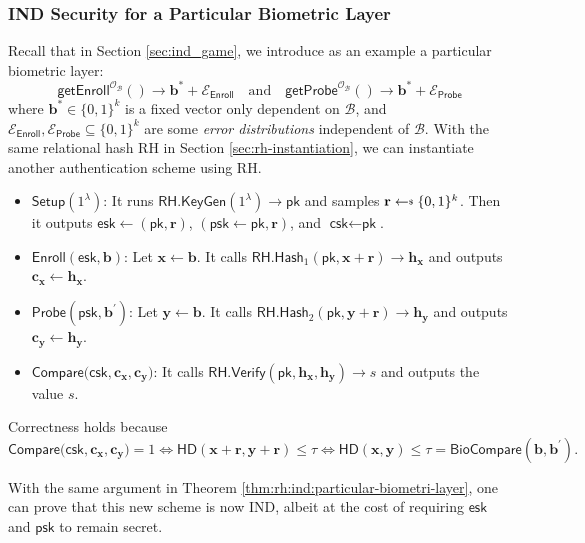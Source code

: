 \subsubsection{IND Security for a Particular Biometric Layer}

Recall that in Section \ref{sec:ind_game}, we introduce as an example a particular biometric layer:
\[
	\textsf{getEnroll}^{\mathcal{O}_{\mathcal{B}}}() \to \mathbf{b}^* + \mathcal{E}_{\textsf{Enroll}}  \quad \text{and} \quad \textsf{getProbe}^{\mathcal{O}_{\mathcal{B}}}() \to \mathbf{b}^* + \mathcal{E}_{\textsf{Probe}}
\]
where $\mathbf{b}^* \in \{0, 1\}^k$ is a fixed vector only dependent on $\mathcal{B}$, and $\mathcal{E}_{\textsf{Enroll}}, \mathcal{E}_{\textsf{Probe}} \subseteq \{0, 1\}^k$ are some \emph{error distributions} independent of $\mathcal{B}$.
With the same relational hash \textsf{RH} in Section \ref{sec:rh-instantiation}, we can instantiate another authentication scheme using \textsf{RH}.

\begin{itemize}

	\item $\textsf{Setup}(1^\lambda)$: It runs $\textsf{RH.KeyGen}(1^\lambda) \to \textsf{pk}$ and samples $\mathbf{r} \getsdollar \{0, 1\}^k$. Then it outputs $\textsf{esk} \gets (\textsf{pk}, \mathbf{r})$, $(\textsf{psk} \gets \textsf{pk}, \mathbf{r})$, and $\textsf{csk} \gets \textsf{pk}$.

	\item $\textsf{Enroll}(\textsf{esk}, \mathbf{b})$: Let $\mathbf{x} \gets \mathbf{b}$. It calls $\textsf{RH.Hash}_1(\textsf{pk}, \mathbf{x} + \mathbf{r}) \to \mathbf{h_x}$ and outputs $\mathbf{c_x} \gets \mathbf{h_x}$.

	\item $\textsf{Probe}(\textsf{psk}, \mathbf{b}^\prime)$: Let $\mathbf{y} \gets \mathbf{b}$. It calls $\textsf{RH.Hash}_2(\textsf{pk}, \mathbf{y} + \mathbf{r}) \to \mathbf{h_y}$ and outputs $\mathbf{c_y} \gets \mathbf{h_y}$.

	\item $\textsf{Compare}(\textsf{csk}, \mathbf{c_x}, \mathbf{c_y)}$: It calls $\textsf{RH.Verify}(\textsf{pk}, \mathbf{h_x}, \mathbf{h_y}) \to s$ and outputs the value $s$.

\end{itemize}
Correctness holds because
\[
	\textsf{Compare}(\textsf{csk}, \mathbf{c_x}, \mathbf{c_y)} = 1 \Leftrightarrow \textsf{HD}(\mathbf{x} + \mathbf{r}, \mathbf{y} + \mathbf{r}) \leq \tau \Leftrightarrow \textsf{HD}(\mathbf{x}, \mathbf{y}) \leq \tau = \textsf{BioCompare}(\mathbf{b}, \mathbf{b}^\prime).
\]

With the same argument in Theorem \ref{thm:rh:ind:particular-biometri-layer}, one can prove that this new scheme is now IND, albeit at the cost of requiring $\textsf{esk}$ and $\textsf{psk}$ to remain secret.

